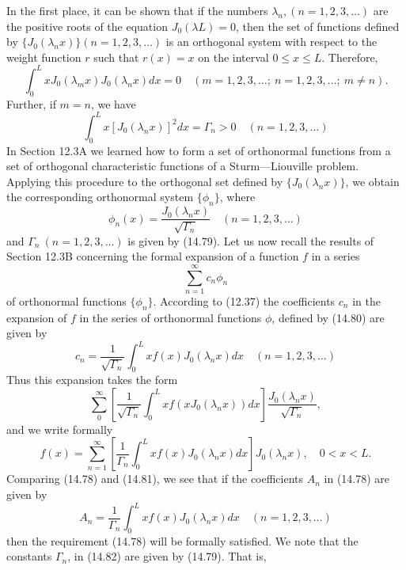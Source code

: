 \documentclass[11pt,a4paper, twoside]{report}
\begin{document}
	In the first place, it can be shown that if the numbers $\lambda_n, (n = 1, 2, 3,\ldots)$ are the positive roots of the equation $J_0(\lambda L) = 0$, then the set of functions defined by $\{J_0(\lambda_nx)\} (n = 1, 2, 3,\ldots)$ is an orthogonal system with respect to the weight function $r$ such that $r(x) = x$ on the interval $0 \leq x \leq L$. Therefore,
	$$
	\int_0^L xJ_0(\lambda_m x)J_0(\lambda_n x)dx = 0\quad (m=1,2,3,\ldots;\ n = 1,2,3,\ldots;\ m\neq n).
	$$
	Further, if $m=n$, we have
	\begin{equation}\tag{14.79}
		\int_0^L x[J_0(\lambda_n x)]^2 dx = \varGamma_n > 0\quad (n=1,2,3,\ldots)
	\end{equation}
	In Section 12.3A we learned how to form a set of orthonormal functions from a set of orthogonal characteristic functions of a Sturm—Liouville problem. Applying this procedure to the orthogonal set defined by $\{J_0(\lambda_n x)\}$, we obtain the corresponding orthonormal system $\{\phi_n\}$, where
	\begin{equation}\tag{14.80}
		\phi_n(x) = \frac{J_0(\lambda_n x)}{\sqrt{\varGamma_n}}\quad (n=1,2,3,\ldots)
	\end{equation}
	and $\varGamma_n\ (n=1,2,3,\ldots)$ is given by (14.79). Let us now recall the results of Section 12.3B concerning the formal expansion of a function $f$ in a series
	$$
	\sum_{n=1}^\infty c_n\phi_n
	$$
	of orthonormal functions $\{\phi_n\}$. According to (12.37) the coefficients $c_n$ in the expansion of $f$ in the series of orthonormal functions $\phi$, defined by (14.80) are given by
	$$
	c_n = \frac{1}{\sqrt{\varGamma_n}}\int_0^L xf(x)J_0(\lambda_n x)dx\quad (n=1,2,3,\ldots)
	$$
	Thus this expansion takes the form
	$$
	\sum_0^\infty \left[\frac{1}{\sqrt{\varGamma_n}}\int_0^L xf(xJ_0(\lambda_n x))dx\right]\frac{J_0(\lambda_nx)}{\sqrt{\varGamma_n}},
	$$
	and we write formally
	\begin{equation}\tag{14.81}
		f(x) = \sum_{n=1}^\infty \left[\frac{1}{\varGamma_n}\int_0^L xf(x)J_0(\lambda_nx)dx\right]J_0(\lambda_nx),\quad 0 < x < L.
	\end{equation}
	Comparing (14.78) and (14.81), we see that if the coefficients $A_n$ in (14.78) are given by
	\begin{equation}\tag{14.82}
		A_n = \frac{1}{\varGamma_n}\int_0^L xf(x) J_0(\lambda_n x)dx\quad (n=1,2,3,\ldots)
	\end{equation}
	then the requirement (14.78) will be formally satisfied. We note that the constants $\varGamma_n$, in (14.82) are given by (14.79). That is,
\end{document}
